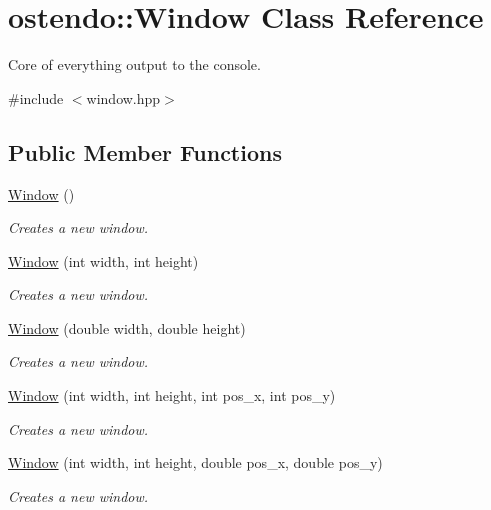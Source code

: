 \hypertarget{classostendo_1_1Window}{}\section{ostendo\+:\+:Window Class Reference}
\label{classostendo_1_1Window}


Core of everything output to the console.  




{\ttfamily \#include $<$window.\+hpp$>$}

\subsection*{Public Member Functions}
\begin{DoxyCompactItemize}
\item 
\hyperlink{classostendo_1_1Window_a3e01eaa1fdbbb8be629165078169b60c}{Window} ()
\begin{DoxyCompactList}\small\item\em Creates a new window. \end{DoxyCompactList}\item 
\hyperlink{classostendo_1_1Window_a080f0b58aef84dbda345d1f8b3591871}{Window} (int width, int height)
\begin{DoxyCompactList}\small\item\em Creates a new window. \end{DoxyCompactList}\item 
\hyperlink{classostendo_1_1Window_a61857975d28428c0086f13180b582617}{Window} (double width, double height)
\begin{DoxyCompactList}\small\item\em Creates a new window. \end{DoxyCompactList}\item 
\hyperlink{classostendo_1_1Window_a08054b16a51c101ea55ec27f628a88c3}{Window} (int width, int height, int pos\+\_\+x, int pos\+\_\+y)
\begin{DoxyCompactList}\small\item\em Creates a new window. \end{DoxyCompactList}\item 
\hyperlink{classostendo_1_1Window_ab53551696f1078083f23a5d0eeb01ee3}{Window} (int width, int height, double pos\+\_\+x, double pos\+\_\+y)
\begin{DoxyCompactList}\small\item\em Creates a new window. \end{DoxyCompactList}\item 

\end{DoxyCompactItemize}
